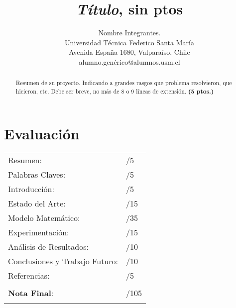 \documentclass[journal, 10pt]{IEEEtran}
\begin{document}
\title{\textit{Título}, sin ptos}
\author{Nombre Integrantes.\\ Universidad Técnica Federico Santa María \\
Avenida España 1680, Valparaíso, Chile \\
alumno.genérico@alumnos.usm.cl }
\maketitle

\section*{Evaluación}

\begin{tabular}{ll}
Resumen: & \underline{\hspace{0.5cm}}/5 \\
Palabras Claves: & \underline{\hspace{0.5cm}}/5 \\
Introducción: & \underline{\hspace{0.5cm}}/5 \\
Estado del Arte:  & \underline{\hspace{0.5cm}}/15 \\
Modelo Matemático: &  \underline{\hspace{0.5cm}}/35 \\
Experimentación: &  \underline{\hspace{0.5cm}}/15 \\
Análisis de Resultados: &  \underline{\hspace{0.5cm}}/10 \\
Conclusiones y Trabajo Futuro: &  \underline{\hspace{0.5cm}}/10 \\
Referencias: & \underline{\hspace{0.5cm}}/5 \\
 &  \\
\textbf{Nota Final}:   & \underline{\hspace{0.5cm}}/105 \\
&  \\
\end{tabular}

\begin{abstract}
\boldmath Resumen de su proyecto. Indicando a grandes rasgos que problema resolvieron, que hicieron, etc. Debe ser breve, no más de 8 o 9 líneas de extensión. \textbf{(5 ptos.)}
\end{abstract}
\end{document}
